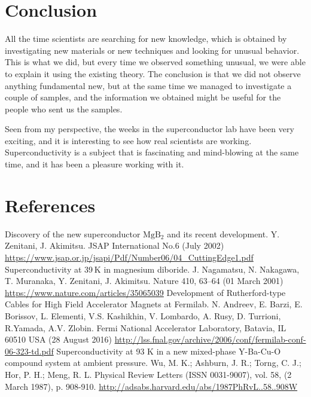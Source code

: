\documentclass{comjnl}
\newcommand*\chem[1]{\ensuremath{\mathrm{#1}}}
\begin{document}
\section{Conclusion} \label{Sec:Conclusion}
All the time scientists are searching for new knowledge, which is obtained by investigating new materials or new techniques and looking for unusual behavior. This is what we did, but every time we observed something unusual, we were able to explain it using the existing theory. The conclusion is that we did not observe anything fundamental new, but at the same time we managed to investigate a couple of samples, and the information we obtained might be useful for the people who sent us the samples. 

Seen from my perspective, the weeks in the superconductor lab have been very exciting, and it is interesting to see how real scientists are working. Superconductivity is a subject that is fascinating and mind-blowing at the same time, and it has been a pleasure working with it.

\section{References}
\begingroup
\renewcommand{\section}[2]{}
\begin{thebibliography}{}
  Discovery of the new superconductor \chem{MgB_2} and its recent development. 
  Y. Zenitani, J. Akimitsu. 
  JSAP International No.6 (July 2002)
  \url{https://www.jsap.or.jp/jsapi/Pdf/Number06/04_CuttingEdge1.pdf}
  Superconductivity at 39 K in magnesium diboride. 
  J. Nagamatsu, N. Nakagawa, T. Muranaka, Y. Zenitani, J. Akimitsu. 
  Nature 410, 63–64 (01 March 2001)
  \url{https://www.nature.com/articles/35065039}
  Development of Rutherford-type Cables for High Field Accelerator Magnets at Fermilab.
  N. Andreev, E. Barzi, E. Borissov, L. Elementi, V.S. Kashikhin, V. Lombardo, A. Rusy, D. Turrioni, 
R.Yamada, A.V. Zlobin.
   Fermi  National  Accelerator  Laboratory,  Batavia, IL 60510 USA (28 August 2016)
  \url{http://lss.fnal.gov/archive/2006/conf/fermilab-conf-06-323-td.pdf}
  Superconductivity at 93 K in a new mixed-phase Y-Ba-Cu-O compound system at ambient pressure.
  Wu, M. K.; Ashburn, J. R.; Torng, C. J.; Hor, P. H.; Meng, R. L.
  Physical Review Letters (ISSN 0031-9007), vol. 58, (2 March 1987), p. 908-910.
  \url{http://adsabs.harvard.edu/abs/1987PhRvL..58..908W}
\end{thebibliography}
\endgroup
\nocite{*}



\end{document}
